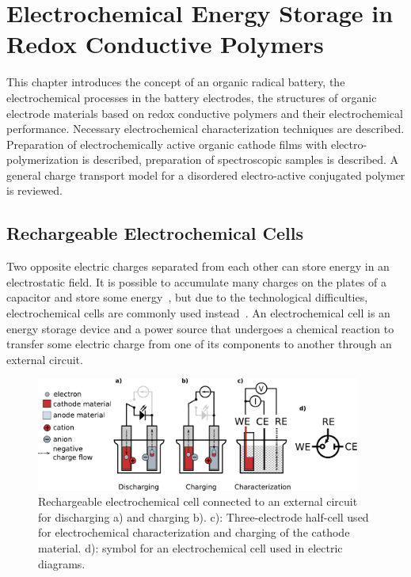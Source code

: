 \chapter{Electrochemical Energy Storage in Redox Conductive Polymers}
This chapter introduces the concept of an organic radical battery, the electrochemical processes in the battery electrodes, the structures of organic electrode materials based on redox conductive polymers and their electrochemical performance. Necessary electrochemical characterization techniques are described. Preparation of electrochemically active organic cathode films with electro-polymerization is described, preparation of spectroscopic samples is described. A general charge transport model for a disordered electro-active conjugated polymer is reviewed.

\section{Rechargeable Electrochemical Cells}
Two opposite electric charges separated from each other can store energy in an electrostatic field. It is possible to accumulate many charges on the plates of a capacitor and store some energy~\cite{He_2022}, but due to the technological difficulties, electrochemical cells are commonly used instead~\cite{Figgener_2020}. An electrochemical cell is an energy storage device and a power source that undergoes a chemical reaction to transfer some electric charge from one of its components to another through an external circuit. 

\begin{figure}[h]
\center
	\includegraphics[width=0.95\textwidth]{./electrochemistry/figures/echem_cells.pdf}
	\caption{Rechargeable electrochemical cell connected to an external circuit for discharging a) and charging b). c): Three-electrode half-cell used for electrochemical characterization and charging of the cathode material. d): symbol for an electrochemical cell used in electric diagrams.}
	\label{fig:echem_cells}
\end{figure}



